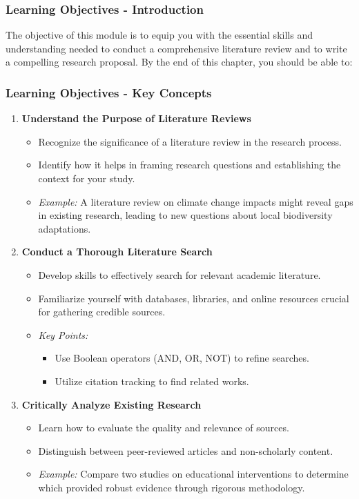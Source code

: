 \documentclass[aspectratio=169]{beamer}
\begin{document}
\begin{frame}[fragile]
    \frametitle{Learning Objectives - Introduction}
    The objective of this module is to equip you with the essential skills and understanding needed to conduct a comprehensive literature review and to write a compelling research proposal. By the end of this chapter, you should be able to:
\end{frame}

\begin{frame}[fragile]
    \frametitle{Learning Objectives - Key Concepts}
    \begin{enumerate}
        \item \textbf{Understand the Purpose of Literature Reviews}
        \begin{itemize}
            \item Recognize the significance of a literature review in the research process.
            \item Identify how it helps in framing research questions and establishing the context for your study.
            \item \textit{Example:} A literature review on climate change impacts might reveal gaps in existing research, leading to new questions about local biodiversity adaptations.
        \end{itemize}

        \item \textbf{Conduct a Thorough Literature Search}
        \begin{itemize}
            \item Develop skills to effectively search for relevant academic literature.
            \item Familiarize yourself with databases, libraries, and online resources crucial for gathering credible sources.
            \item \textit{Key Points:}
                \begin{itemize}
                    \item Use Boolean operators (AND, OR, NOT) to refine searches.
                    \item Utilize citation tracking to find related works.
                \end{itemize}
        \end{itemize}
        
        \item \textbf{Critically Analyze Existing Research}
        \begin{itemize}
            \item Learn how to evaluate the quality and relevance of sources.
            \item Distinguish between peer-reviewed articles and non-scholarly content.
            \item \textit{Example:} Compare two studies on educational interventions to determine which provided robust evidence through rigorous methodology.
        \end{itemize}
    \end{enumerate}
\end{frame}
\end{document}
